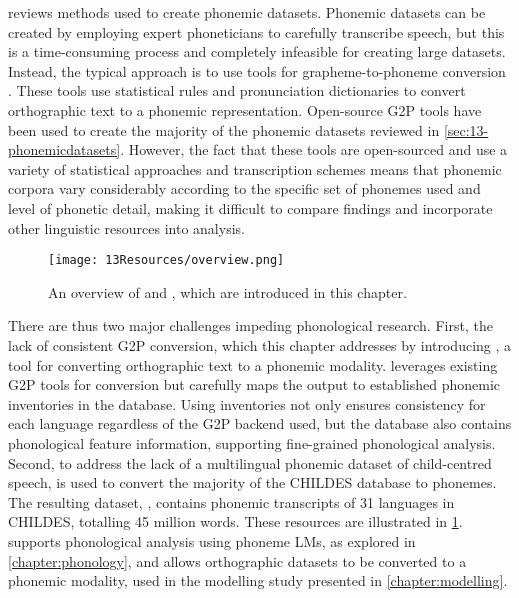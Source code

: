  reviews methods used to create phonemic datasets. Phonemic datasets can be created by employing expert phoneticians to carefully transcribe speech, but this is a time-consuming process and completely infeasible for creating large datasets. Instead, the typical approach is to use tools for grapheme-to-phoneme conversion \citep[G2P;][]{lucassen1984information}. These tools use statistical rules and pronunciation dictionaries to convert orthographic text to a phonemic representation. Open-source G2P tools have been used to create the majority of the phonemic datasets reviewed in \cref{sec:13-phonemicdatasets}. However, the fact that these tools are open-sourced and use a variety of statistical approaches and transcription schemes means that phonemic corpora vary considerably according to the specific set of phonemes used and level of phonetic detail, making it difficult to compare findings and incorporate other linguistic resources into analysis.

\begin{figure}[t]
    \centering
    \texttt{[image: 13Resources/overview.png]}
    \caption{An overview of \ipachildes and \gpp, which are introduced in this chapter.}
    \label{fig:13-overview}
\end{figure}

There are thus two major challenges impeding phonological research. First, the lack of consistent G2P conversion, which this chapter addresses by introducing \gpp, a tool for converting orthographic text to a phonemic modality. \gpp leverages existing G2P tools for conversion but carefully maps the output to established phonemic inventories in the \phoible database. Using \phoible inventories not only ensures consistency for each language regardless of the G2P backend used, but the database also contains phonological feature information, supporting fine-grained phonological analysis. Second, to address the lack of a multilingual phonemic dataset of child-centred speech, \gpp is used to convert the majority of the CHILDES database to phonemes. The resulting dataset, \ipachildes, contains phonemic transcripts of 31 languages in CHILDES, totalling 45 million words. These resources are illustrated in \cref{fig:13-overview}. \ipachildes supports phonological analysis using phoneme LMs, as explored in \cref{chapter:phonology}, and \gpp allows orthographic datasets to be converted to a phonemic modality, used in the modelling study presented in \cref{chapter:modelling}. %

